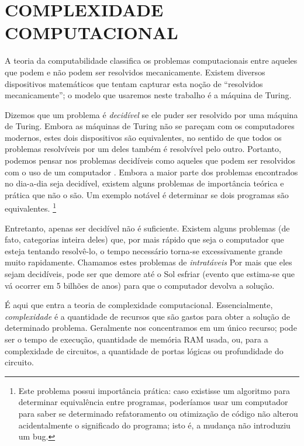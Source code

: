 \chapter{COMPLEXIDADE COMPUTACIONAL}

A teoria da computabilidade
classifica os problemas computacionais entre
aqueles que podem e não podem ser resolvidos mecanicamente.
Existem diversos dispositivos matemáticos
que tentam capturar esta noção de
``resolvidos mecanicamente'';
o modelo que usaremos neste trabalho é a máquina de Turing.

Dizemos que um problema é \emph{decidível}
se ele puder ser resolvido por uma máquina de Turing.
Embora as máquinas de Turing
não se pareçam com os computadores modernos,
estes dois dispositivos são equivalentes,
no sentido de que
todos os problemas resolvíveis por um deles
também é resolvível pelo outro.
Portanto, podemos pensar nos problemas decidíveis
como aqueles que podem ser resolvidos com o uso de um computador
\cite[p. 307]{HopcroftMotwaniUllman2001}.
Embora a maior parte dos problemas
encontrados no dia-a-dia seja decidível,
existem alguns problemas de importância teórica e prática
que não o são.
Um exemplo notável é determinar se dois programas são equivalentes.
\footnote{
    Este problema possui importância prática:
    caso existisse um algoritmo para determinar equivalência entre programas,
    poderíamos usar um computador para saber se
    determinado refatoramento ou otimização de código
    não alterou acidentalmente o significado do programa;
    isto é, a mudança não introduziu um bug.
}

Entretanto,
apenas ser decidível não é suficiente.
Existem alguns problemas
(de fato, categorias inteira deles)
que, por mais rápido que seja o computador
que esteja tentando resolvê-lo,
o tempo necessário torna-se excessivamente grande
muito rapidamente.
Chamamos estes problemas de \emph{intratáveis}
\cite[p. 1]{HopcroftMotwaniUllman2001}
Por mais que eles sejam decidíveis,
pode ser que demore até o Sol esfriar
(evento que estima-se que vá ocorrer em 5 bilhões de anos)
para que o computador devolva a solução.

É aqui que entra a teoria de complexidade computacional.
Essencialmente,
\emph{complexidade}
é a quantidade de recursos que são gastos
para obter a solução de determinado problema.
Geralmente nos concentramos em um único recurso;
pode ser o tempo de execução,
quantidade de memória RAM usada,
ou,
para a complexidade de circuitos,
a quantidade de portas lógicas
ou profundidade do circuito.

